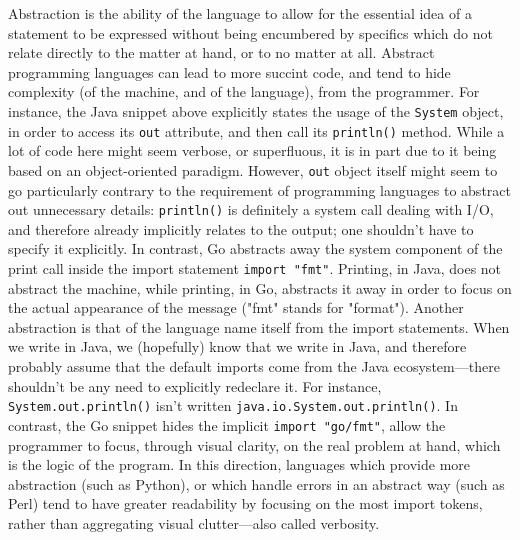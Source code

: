 \documentclass{article}
\begin{document}
Abstraction is the ability of the language to allow for the essential idea of a statement to be expressed without being encumbered by specifics which do not relate directly to the matter at hand, or to no matter at all. Abstract programming languages can lead to more succint code, and tend to hide complexity (of the machine, and of the language), from the programmer. For instance, the Java snippet above explicitly states the usage of the \lstinline{System} object, in order to access its \lstinline{out} attribute, and then call its \lstinline{println()} method. While a lot of code here might seem verbose, or superfluous, it is in part due to it being based on an object-oriented paradigm. However, \lstinline{out} object itself might seem to go particularly contrary to the requirement of programming languages to abstract out unnecessary details: \lstinline{println()} is definitely a system call dealing with I/O, and therefore already implicitly relates to the output; one shouldn't have to specify it explicitly. In contrast, Go abstracts away the system component of the print call inside the import statement \lstinline{import "fmt"}. Printing, in Java, does not abstract the machine, while printing, in Go, abstracts it away in order to focus on the actual appearance of the message ("fmt" stands for "format"). Another abstraction is that of the language name itself from the import statements. When we write in Java, we (hopefully) know that we write in Java, and therefore probably assume that the default imports come from the Java ecosystem—there shouldn't be any need to explicitly redeclare it. For instance, \lstinline{System.out.println()} isn't written \lstinline{java.io.System.out.println()}. In contrast, the Go snippet hides the implicit \lstinline{import "go/fmt"}, allow the programmer to focus, through visual clarity, on the real problem at hand, which is the logic of the program. In this direction, languages which provide more abstraction (such as Python), or which handle errors in an abstract way (such as Perl) tend to have greater readability by focusing on the most import tokens, rather than aggregating visual clutter—also called verbosity.
\end{document}
